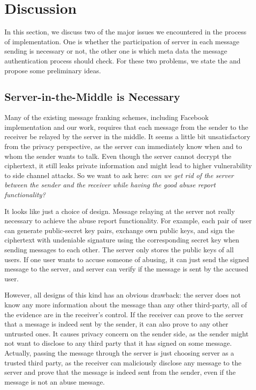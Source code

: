 
\section{Discussion}
In this section, we discuss two of the major issues we encountered in the process of implementation.
One is whether the participation of server in each message sending is necessary or not,
the other one is which meta data the message authentication process should check.
For these two problems, we state the 
and propose some preliminary ideas.


\subsection{Server-in-the-Middle is Necessary}
Many of the existing message franking schemes,
including Facebook implementation and our work,
requires that each message from the sender to the receiver be relayed by the server in the middle.
It seems a little bit unsatisfactory from the privacy perspective,
as the server can immediately know when and to whom the sender wants to talk.
Even though the server cannot decrypt the ciphertext,
it still leaks private information and might lead to higher vulnerability to side channel attacks.
So we want to ask here: \emph{can we get rid of the server between the sender and the receiver while having the good abuse report functionality?}

It looks like just a choice of design.
Message relaying at the server not really necessary to achieve the abuse report functionality.
For example, each pair of user can generate public-secret key pairs, exchange own public keys,
and sign the ciphertext with undeniable signature using the corresponding secret key when sending messages to each other.
The server only stores the public keys of all users.
If one user wants to accuse someone of abusing, it can just send the signed message to the server,
and server can verify if the message is sent by the accused user.

However, all designs of this kind has an obvious drawback:
the server does not know any more information about the message than any other third-party,
all of the evidence are in the receiver's control. 
If the receiver can prove to the server that a message is indeed sent by the sender,
it can also prove to any other untrusted ones.
It causes privacy concern on the sender side, 
as the sender might not want to disclose to any third party that it has signed on some message.
Actually, passing the message through the server
is just choosing server as a trusted third party,
as the receiver can maliciously disclose any message to the server and prove that the message is indeed sent from the sender,
even if the message is not an abuse message.



